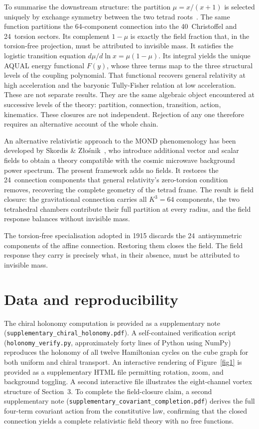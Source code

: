\documentclass[twocolumn]{iopjournal}
\begin{document}
To summarise the downstream structure: the partition
$\mu = x/(x{+}1)$ is selected uniquely by exchange symmetry
between the two tetrad roots~\cite{Nelson2026b}.  The same
function partitions the 64-component connection into the
40~Christoffel and 24~torsion sectors.  Its complement
$1 - \mu$ is exactly the field fraction that, in the
torsion-free projection, must be attributed to invisible mass.
It satisfies the logistic transition equation
$d\mu/d\!\ln x = \mu(1{-}\mu)$.  Its integral yields the
unique AQUAL energy functional $F(y)$, whose three terms map
to the three structural levels of the coupling polynomial.
That functional recovers general relativity at high
acceleration and the baryonic Tully-Fisher relation at low
acceleration.  These are not separate results.  They are the
same algebraic object encountered at successive levels of the
theory: partition, connection, transition, action, kinematics.
These closures are not independent.  Rejection of any one
therefore requires an alternative account of the whole chain.

An alternative relativistic approach to the MOND phenomenology
has been developed by Skordis \&
Z\l{}o\'{s}nik~\cite{SkordisZlosnik2021}, who introduce
additional vector and scalar fields to obtain a theory
compatible with the cosmic microwave background power spectrum.
The present framework adds no fields.  It restores the
24~connection components that general relativity's zero-torsion
condition removes, recovering the complete geometry of the
tetrad frame.  The result is field closure: the gravitational
connection carries all $K^3 = 64$ components, the two
tetrahedral chambers contribute their full partition at every
radius, and the field response balances without invisible mass.

The torsion-free specialisation adopted in 1915 discards the
24~antisymmetric components of the affine connection.
Restoring them closes the field.  The field response they
carry is precisely what, in their absence, must be attributed
to invisible mass.


\section{Data and reproducibility}

The chiral holonomy computation is provided as a supplementary
note (\texttt{supplementary\_chiral\_holonomy.pdf}).  A
self-contained verification script
(\texttt{holonomy\_verify.py}, approximately forty lines of
Python using NumPy) reproduces the holonomy of all twelve
Hamiltonian cycles on the cube graph for both uniform and
chiral transport.  An interactive rendering of
Figure~\ref{fig1} is provided as a
supplementary HTML file permitting rotation, zoom, and
background toggling.  A second interactive file illustrates
the eight-channel vortex structure of Section~3.  To complete
the field-closure claim, a second supplementary note
(\texttt{supplementary\_covariant\_completion.pdf}) derives the
full four-term covariant action from the constitutive law,
confirming that the closed connection yields a complete
relativistic field theory with no free functions.
\end{document}
